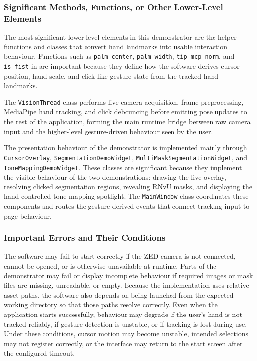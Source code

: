 ﻿\documentclass[11pt,a4paper]{article}
\begin{document}
\subsubsection{Significant Methods, Functions, or Other Lower-Level Elements}

The most significant lower-level elements in this demonstrator are the helper
functions and classes that convert hand landmarks into usable interaction
behaviour. Functions such as \texttt{palm\_center}, \texttt{palm\_width},
\texttt{tip\_mcp\_norm}, and \texttt{is\_fist} in
 are important because they define how the
software derives cursor position, hand scale, and click-like gesture state
from the tracked hand landmarks.

\medskip

\noindent
The \texttt{VisionThread} class performs live camera acquisition, frame
preprocessing, MediaPipe hand tracking, and click debouncing before emitting
pose updates to the rest of the application, forming the main runtime bridge
between raw camera input and the higher-level gesture-driven behaviour seen by
the user.

\medskip

\noindent
The presentation behaviour of the demonstrator is implemented mainly through
\texttt{CursorOverlay}, \texttt{SegmentationDemoWidget},
\texttt{MultiMaskSegmentationWidget}, and \texttt{ToneMappingDemoWidget}.
These classes are significant because they implement the visible behaviour of
the two demonstrations: drawing the live overlay, resolving clicked
segmentation regions, revealing RNvU masks, and displaying the hand-controlled
tone-mapping spotlight. The \texttt{MainWindow} class coordinates these
components and routes the gesture-derived events that connect tracking input
to page behaviour.

\subsubsection{Important Errors and Their Conditions}

The software may fail to start correctly if the ZED camera is not connected,
cannot be opened, or is otherwise unavailable at runtime. Parts of the
demonstrator may fail or display incomplete behaviour if required images or
mask files are missing, unreadable, or empty. Because the implementation uses
relative asset paths, the software also depends on being launched from the
expected working directory so that those paths resolve correctly. Even when
the application starts successfully, behaviour may degrade if the user's hand
is not tracked reliably, if gesture detection is unstable, or if tracking is
lost during use. Under these conditions, cursor motion may become unstable,
intended selections may not register correctly, or the interface may return
to the start screen after the configured timeout.
\end{document}

